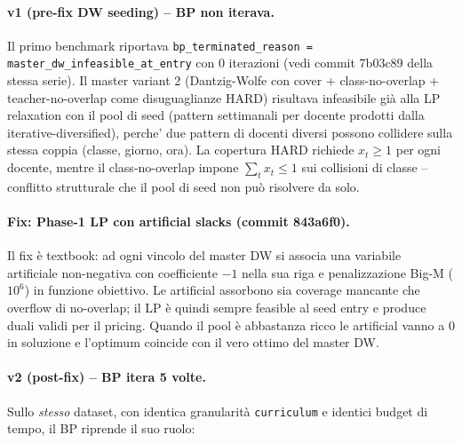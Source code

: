 \paragraph{v1 (pre-fix DW seeding) -- BP non iterava.}
Il primo benchmark riporta\-va
\texttt{bp\_terminated\_reason = master\_dw\_infeasible\_at\_entry}
con 0 iterazioni (vedi commit 7b03c89 della stessa
serie). Il master variant 2 (Dantzig-Wolfe con cover +
class-no-overlap + teacher-no-overlap come disuguaglianze HARD)
risultava infeasibile gi\`a alla LP relaxation con il pool di
seed (pattern settimanali per docente prodotti dalla
iterative-diversified), perche' due pattern di docenti diversi
possono collidere sulla stessa coppia (classe, giorno, ora).
La copertura HARD richiede $x_t \geq 1$ per ogni docente,
mentre il class-no-overlap impone $\sum_t x_t \leq 1$ sui
collisioni di classe -- conflitto strutturale che il pool di
seed non pu\`o risolvere da solo.

\paragraph{Fix: Phase-1 LP con artificial slacks (commit 843a6f0).}
Il fix \`e textbook: ad ogni vincolo del master DW si associa
una variabile artificiale non-negativa con coefficiente $-1$
nella sua riga e penalizzazione Big-M ($10^{6}$) in funzione
obiettivo. Le artificial assorbono sia coverage mancante che
overflow di no-overlap; il LP \`e quindi sempre feasible al
seed entry e produce duali validi per il pricing. Quando il pool
\`e abbastanza ricco le artificial vanno a $0$ in soluzione e
l'optimum coincide con il vero ottimo del master DW.

\paragraph{v2 (post-fix) -- BP itera 5 volte.}
Sullo \emph{stesso} dataset, con identica granularit\`a
\texttt{curriculum} e identici budget di tempo, il BP riprende
il suo ruolo:

